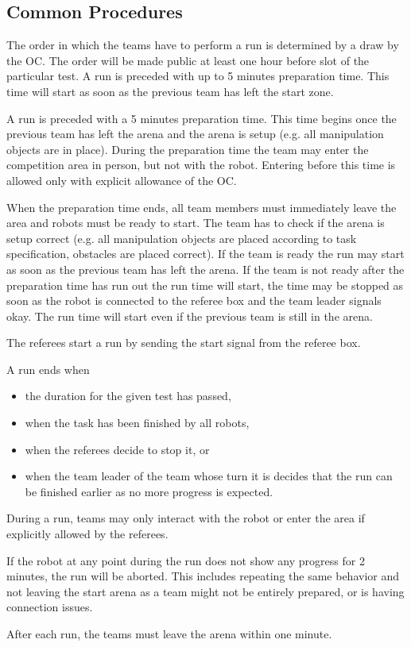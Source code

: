 \subsection{Common Procedures} 
The order in which the teams have to perform a run is determined by a draw by the OC. The order will be made public at least one hour before slot of the particular test. A run is preceded with up to 5 minutes preparation time. This time will start as soon as the previous team has left the start zone. 
\par
A run is preceded with a 5 minutes preparation time. This time begins once the previous team has left the arena and the arena is setup (e.g. all manipulation objects are in place). During the preparation time the team may enter the competition area in person, but not with the robot. Entering before this time is allowed only with explicit allowance of the OC.
\par
When the preparation time ends, all team members must immediately leave the area and robots must be ready to start. The team has to check if the arena is setup correct (e.g. all manipulation objects are placed according to task specification, obstacles are placed correct). If the team is ready the run may start as soon as the previous team has left the arena. If the team is not ready after the preparation time has run out the run time will start, the time may be stopped as soon as the robot is connected to the referee box and the team leader signals okay. The run time will start even if the previous team is still in the arena.


\par
The referees start a run by sending the start signal from the referee box.
\par
A run ends when 
\begin{itemize}
	\item the duration for the given test has passed,
	\item when the task has been finished by all robots,
	\item when the referees decide to stop it, or 
	\item when the team leader of the team whose turn it is decides that the run can be finished earlier as no more progress is expected.
\end{itemize}
\par
During a run, teams may only interact with the robot or enter the area if explicitly allowed by the referees.
\par
If the robot at any point during the run does not show any progress for 2 minutes, the run will be aborted. This includes repeating the same behavior and not leaving the start arena as a team might not be entirely prepared, or is having connection issues.
\par
After each run, the teams must leave the arena within one minute.

